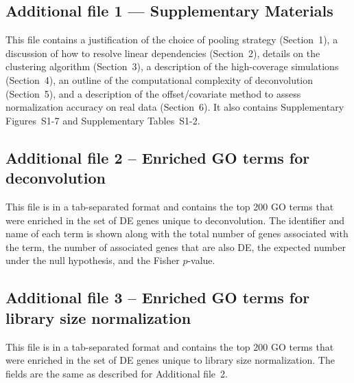 \documentclass{bmcart}
\newcommand{\supppoolsim}{1}
\newcommand{\supplineardep}{2}
\newcommand{\suppclustering}{3}
\newcommand{\supphighcov}{4}
\newcommand{\supptimecomp}{5}
\newcommand{\supprealassess}{6}
\newcommand{\revised}[1]{#1}
\begin{document}
\begin{backmatter}
\subsection*{Additional file 1 --- Supplementary Materials}
This file contains \revised{a justification of the choice of pooling strategy (Section~\supppoolsim{}),
    a discussion of how to resolve linear dependencies (Section~\supplineardep{}),
    details on the clustering algorithm (Section~\suppclustering{}),
    a description of the high-coverage simulations (Section~\supphighcov{}),
    an outline of the computational complexity of deconvolution (Section~\supptimecomp{}),
    and a description of the offset/covariate method to assess normalization accuracy on real data (Section~\supprealassess{}).}
It also contains Supplementary Figures~S1-7 and Supplementary Tables~S1-2.

\subsection*{Additional file 2 -- Enriched GO terms for deconvolution}
This file is in a tab-separated format and contains the top 200 GO terms that were enriched in the set of DE genes unique to deconvolution.
The identifier and name of each term is shown along with the total number of genes associated with the term, the number of associated genes that are also DE, the expected number under the null hypothesis, and the Fisher $p$-value.

\subsection*{Additional file 3 -- Enriched GO terms for library size normalization}
This file is in a tab-separated format and contains the top 200 GO terms that were enriched in the set of DE genes unique to library size normalization.
The fields are the same as described for Additional file~2.

\end{backmatter}
\end{document}
